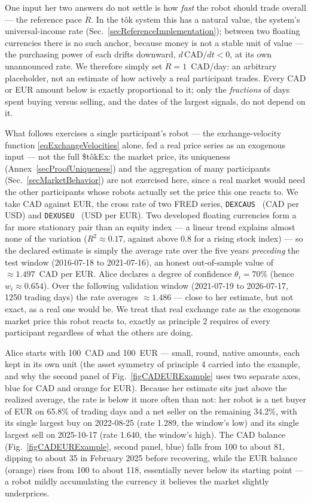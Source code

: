 \documentclass[letterpaper]{article}
\newcommand{\StokEx}{\$t\^{o}kEx}
\begin{document}
One input her two answers do not settle is how \emph{fast} the robot should trade overall --- the reference pace $\dot{R}$. In the t\^{o}k system this has a natural value, the system's universal-income rate (Sec.~\ref{secReferenceImplementation}); between two floating currencies there is no such anchor, because money is not a stable unit of value --- the purchasing power of each drifts downward, $d\,\mathrm{CAD}/dt < 0$, at its own unannounced rate. We therefore simply set $\dot{R} = 1$~CAD/day: an arbitrary placeholder, not an estimate of how actively a real participant trades. Every CAD or EUR amount below is exactly proportional to it; only the \emph{fractions} of days spent buying versus selling, and the dates of the largest signals, do not depend on it.

What follows exercises a single participant's robot --- the exchange-velocity function \eqref{eqExchangeVelocities} alone, fed a real price series as an exogenous input --- not the full \StokEx{}: the market price, its uniqueness (Annex~\ref{secProofUniqueness}) and the aggregation of many participants (Sec.~\ref{secMarketBehavior}) are not exercised here, since a real market would need the other participants whose robots actually set the price this one reacts to. We take CAD against EUR, the cross rate of two FRED series, \texttt{DEXCAUS}~\cite{FREDDEXCAUS} (CAD per USD) and \texttt{DEXUSEU}~\cite{FREDDEXUSEU} (USD per EUR). Two developed floating currencies form a far more stationary pair than an equity index --- a linear trend explains almost none of the variation ($R^2\approx0.17$, against above $0.8$ for a rising stock index) --- so the declared estimate is simply the average rate over the five years \emph{preceding} the test window (2016-07-18 to 2021-07-16), an honest out-of-sample value of $\approx1.497$~CAD per EUR. Alice declares a degree of confidence $\theta_i=70\%$ (hence $w_i\approx0.654$). Over the following validation window (2021-07-19 to 2026-07-17, 1250 trading days) the rate averages $\approx1.486$ --- close to her estimate, but not exact, as a real one would be. We treat that real exchange rate as the exogenous market price this robot reacts to, exactly as principle 2 requires of every participant regardless of what the others are doing.

Alice starts with 100~CAD and 100~EUR --- small, round, native amounts, each kept in its own unit (the asset symmetry of principle 4 carried into the example, and why the second panel of Fig.~\ref{figCADEURExample} uses two separate axes, blue for CAD and orange for EUR). Because her estimate sits just above the realized average, the rate is below it more often than not: her robot is a net buyer of EUR on 65.8\% of trading days and a net seller on the remaining 34.2\%, with its single largest buy on 2022-08-25 (rate 1.289, the window's low) and its single largest sell on 2025-10-17 (rate 1.640, the window's high). The CAD balance (Fig.~\ref{figCADEURExample}, second panel, blue) falls from 100 to about 81, dipping to about 35 in February 2025 before recovering, while the EUR balance (orange) rises from 100 to about 118, essentially never below its starting point --- a robot mildly accumulating the currency it believes the market slightly underprices.
\end{document}
